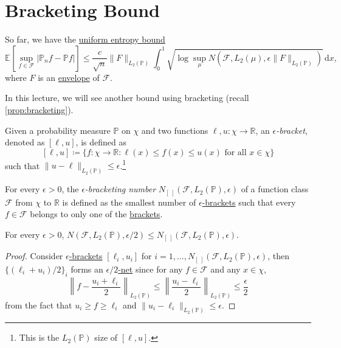 \section{Bracketing Bound}
\begin{prev}
	So far, we have the \hyperref[thm:uniform-entropy-integral-bound]{uniform entropy bound}
	\[
		\mathbb{E}_{}\left[\sup _{f\in \mathscr{F} } \vert \mathbb{P} _n f - \mathbb{P} f \vert \right]
		\leq \frac{c}{\sqrt{n} } \lVert F \rVert _{L_2(\mathbb{P} )} \int_{0}^{1} \sqrt{\log \sup _\mu N(\mathscr{F} , L_2(\mu ), \epsilon \lVert F \rVert _{L_2(\mathbb{P} )})}  \,\mathrm{d}x,
	\]
	where \(F\) is an \hyperref[def:envelope]{envelope} of \(\mathscr{F} \).
\end{prev}

In this lecture, we will see another bound using bracketing (recall \autoref{prop:bracketing}).

\begin{definition}\label{def:eps-bracket}
	Given a probability measure \(\mathbb{P} \) on \(\chi \) and two functions \(\ell , u\colon \chi \to \mathbb{R} \), an \emph{\(\epsilon \)-bracket}, denoted as \([\ell , u]\), is defined as
	\[
		[\ell , u] \coloneqq \{ f\colon \chi \to \mathbb{R} \colon \ell (x) \leq f(x) \leq u(x) \text{ for all } x\in \chi  \}
	\]
	such that \(\lVert u - \ell \rVert _{L_2(\mathbb{P} )} \leq \epsilon \).\footnote{This is the \(L_2(\mathbb{P} )\) size of \([\ell , u]\).}
\end{definition}

\begin{definition}\label{def:bracketing-number}
	For every \(\epsilon > 0\), the \emph{\(\epsilon \)-bracketing number} \(N_{[\ ]}(\mathscr{F} , L_2(\mathbb{P} ), \epsilon )\) of a function class \(\mathscr{F} \) from \(\chi \) to \(\mathbb{R} \) is defined as the smallest number of \hyperref[def:eps-bracket]{\(\epsilon \)-brackets} such that every \(f\in \mathscr{F} \) belongs to only one of the \hyperref[def:eps-bracket]{brackets}.
\end{definition}


\begin{lemma}
	For every \(\epsilon > 0\), \(N(\mathscr{F} , L_2(\mathbb{P} ), \epsilon / 2) \leq N_{[\ ]}(\mathscr{F} , L_2(\mathbb{P} ), \epsilon )\).
\end{lemma}
\begin{proof}
	Consider \hyperref[def:eps-bracket]{\(\epsilon \)-brackets} \([\ell _i, u_i]\) for \(i = 1, \dots , N_{[\ ]}(\mathscr{F} , L_2(\mathbb{P} ), \epsilon )\), then \(\{ (\ell _i + u_i) / 2 \}_i\) forms an \hyperref[def:eps-net]{\(\epsilon / 2\)-net} since for any \(f\in\mathscr{F} \) and any \(x\in \chi \),
	\[
		\left\lVert f - \frac{u_i + \ell _i}{2} \right\rVert _{L_2(\mathbb{P} )}
		\leq \left\lVert \frac{u_i - \ell _i}{2} \right\rVert _{L_2(\mathbb{P} )}
		\leq \frac{\epsilon}{2}
	\]
	from the fact that \(u_i \geq f \geq \ell _i\) and \(\lVert u_i - \ell _i \rVert _{L_2(\mathbb{P} )} \leq \epsilon \).
\end{proof}

